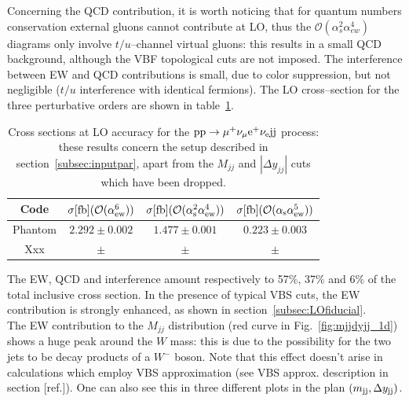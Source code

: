Concerning the QCD contribution, it is worth noticing that for quantum numbers conservation external gluons cannot contribute at LO, thus the $\mathcal{O}(\alpha_s^2\alpha_{ew}^4)$ diagrams only involve $t/u$--channel virtual gluons: this results in a small QCD background, although the VBF topological cuts are not imposed. The interference between EW and QCD contributions is small, due to color suppression, but not negligible ($t/u$ interference with identical fermions). The LO cross--section for the three perturbative orders are shown in table~\ref{tab:LOscanXsec}.
\begin{table}[h!]
    \centering
    \begin{tabular}{c|c|c|c}
        Code  &  $\sigma[\rm{fb}] (\mathcal{O}(\alpha_{ew}^6))$ & $\sigma[\rm{fb}] (\mathcal{O}(\alpha_s^2\alpha_{ew}^4))$ & $\sigma[\rm{fb}] (\mathcal{O}(\alpha_s\alpha_{ew}^5))$ \\
        \hline
        \hline
        {\sc Phantom}  &  $ 2.292 \pm 0.002 $ & $ 1.477 \pm 0.001 $ & $ 0.223 \pm 0.003 $ \\
        {\sc Xxx}&  $ \pm $ & $ \pm $ & $ \pm $
    \end{tabular}
    \caption{\label{tab:LOscanXsec} Cross sections at LO accuracy for the ${\rm p}{\rm p}\to\mu^+\nu_\mu{\rm e}^+\nu_{\rm e}{\rm j}{\rm j}$ process: these results concern the setup described in section~\ref{subsec:inputpar}, apart from the $M_{jj}$ and $|\Delta y_{jj}|$ cuts which have been dropped.}
\end{table}
The EW, QCD and interference amount respectively to 57\%, 37\% and 6\% of the total inclusive cross section. In the presence of typical VBS cuts, the EW contribution is strongly enhanced, as shown in section~\ref{subsec:LOfiducial}.\\
The EW contribution to the $M_{jj}$ distribution (red curve in Fig.~\ref{fig:mjjdyjj_1d}) shows a huge peak around the $W$ mass: this is due to the possibility for the two jets to be decay products of a $W^-$ boson. Note that this effect doesn't arise in calculations which employ VBS approximation (see VBS approx. description in section [ref.]).
One can also see this in three different plots in the plan $\left(m_{\text{j}\text{j}}, \Delta y_{\text{j}\text{j}}\right)$.
